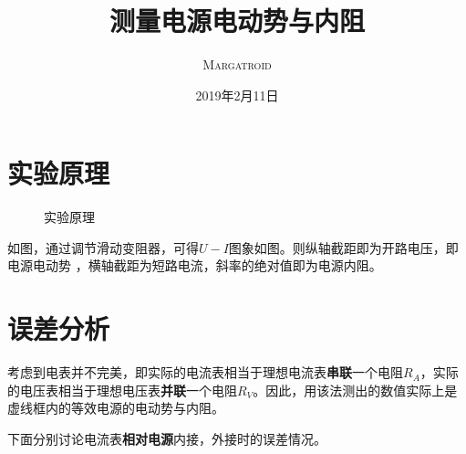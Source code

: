 \documentclass[UTF8,b5paper]{ctexart}
\title{测量电源电动势与内阻}
\author{\textsc{Margatroid}}
\date{2019年2月11日}
\begin{document}
\maketitle
\section{实验原理}
\begin{figure}[H]
  \centering
  \caption{实验原理}
\end{figure}
如图，通过调节滑动变阻器，可得$U-I$图象如图。则纵轴截距即为开路电压，即电源电动势
，横轴截距为短路电流，斜率的绝对值即为电源内阻。
\section{误差分析}
考虑到电表并不完美，即实际的电流表相当于理想电流表\textbf{串联}一个电阻$R_A$，实际的电压表相当于理想电压表\textbf{并联}一个电阻$R_V$。因此，用该法测出的数值实际上是虚线框内的等效电源的电动势与内阻。

下面分别讨论电流表\textbf{相对电源}内接，外接时的误差情况。
\end{document}
